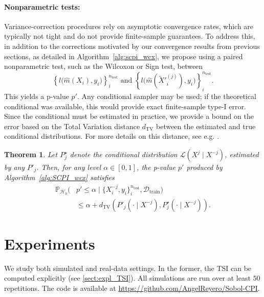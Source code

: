 \documentclass{article}
\theoremstyle{plain}
\newtheorem{theorem}{Theorem}[section]
\theoremstyle{definition}
\theoremstyle{remark}
\begin{document}
\paragraph{Nonparametric tests:} Variance-correction procedures rely on asymptotic convergence rates, which are typically not tight and do not provide finite-sample guarantees. To address this, in addition to the corrections motivated by our convergence results from previous sections, as detailed in Algorithm~\ref{alg:scpi_wcx}, we propose using a paired nonparametric test, such as the Wilcoxon or Sign test, between
\[
        \left\{l\bigl(\widehat{m}(X_{i}), y_i\bigr)\right\}_i^{n_\mathrm{test}}
        \text{ and }
        \left\{l\bigl(\widehat{m}(\widetilde{X}'^{(j)}_{i}), y_i\bigr)\right\}_i^{n_\mathrm{test}}.
    \]
This yields a p-value $p'$. Any conditional sampler may be used; if the theoretical conditional was available, this would provide exact finite-sample type-I error. Since the conditional must be estimated in practice, we provide a bound on the error based on the Total Variation distance $d_\mathrm{TV}$ between the estimated and true conditional distributions. For more details on this distance, see e.g.  \citet{Berrett}.
%
\begin{theorem}\label{th:wcx_TV} Let $P^\star_j$ denote the conditional distribution $\mathcal{L}(X^j \mid X^{-j})$, estimated by any $P'_j$. Then, for any level $\alpha \in [0,1]$, the p-value $p'$ produced by Algorithm~\ref{alg:SCPI_wcx} satisfies
\begin{align*}
\mathbb{P}_{\mathcal{H}_0}(&p'\leq \alpha\mid \{X^{-j}_i, y_i\}_i^{n_\mathrm{test}}, \mathcal{D}_\mathrm{train})\\&\leq \alpha +d_\mathrm{TV}(P'_j(\cdot\mid X^{-j}), P^\star_j(\cdot\mid X^{-j})).    
\end{align*}
\end{theorem}
%
%
\section{Experiments}\label{sect:exps}
%
We study both simulated and real-data settings. In the former, the TSI can be computed explicitly (see \cref{sect:expl_TSI}). All simulations are run over at least $50$ repetitions. The code is available at
\url{https://github.com/AngelReyero/Sobol-CPI}.
\end{document}
